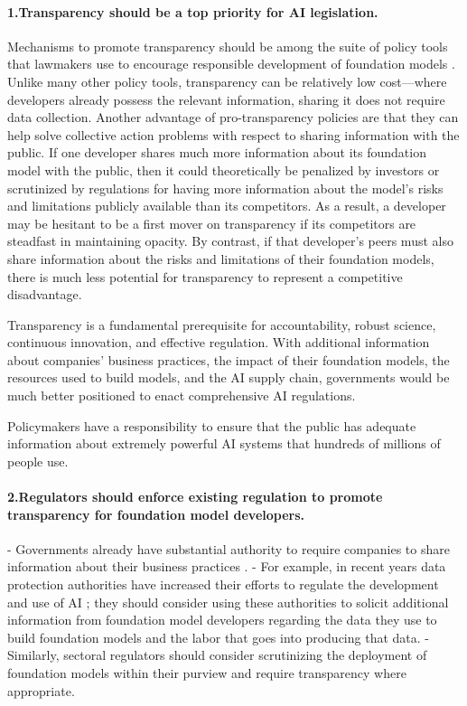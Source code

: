 \paragraph{1.\phantom{X}Transparency should be a top priority for AI legislation.} 
\begin{myitemize}
\item Mechanisms to promote transparency should be among the suite of policy tools that lawmakers use to encourage responsible development of foundation models \citep{engler2023casc, hacker2023gpt}.
Unlike many other policy tools, transparency can be relatively low cost---where developers already possess the relevant information, sharing it does not require data collection. 
Another advantage of pro-transparency policies are that they can help solve collective action problems with respect to sharing information with the public. 
If one developer shares much more information about its foundation model with the public, then it could theoretically be penalized by investors or scrutinized by regulations for having more information about the model's risks and limitations publicly available than its competitors. 
As a result, a developer may be hesitant to be a first mover on transparency if its competitors are steadfast in maintaining opacity. 
By contrast, if that developer's peers must also share information about the risks and limitations of their foundation models, there is much less potential for transparency to represent a competitive disadvantage. 
\item Transparency is a fundamental prerequisite for accountability, robust science, continuous innovation, and effective regulation. 
With additional information about companies' business practices, the impact of their foundation models, the resources used to build models, and the AI supply chain, governments would be much better positioned to enact comprehensive AI regulations. 
\item Policymakers have a responsibility to ensure that the public has adequate information about extremely powerful AI systems that hundreds of millions of people use. 
\end{myitemize}
\paragraph{2.\phantom{X}Regulators should enforce existing regulation to promote transparency for foundation model developers.} 
-  Governments already have substantial authority to require companies to share information about their business practices \cite{ho2012fudging, hess2019ttrap, irion2022algoff}.
- For example, in recent years data protection authorities have increased their efforts to regulate the development and use of AI \citep{zanfir-f2023fpf}; they should consider using these authorities to solicit additional information from foundation model developers regarding the data they use to build foundation models and the labor that goes into producing that data.
- Similarly, sectoral regulators should consider scrutinizing the deployment of foundation models within their purview and require transparency where appropriate.
